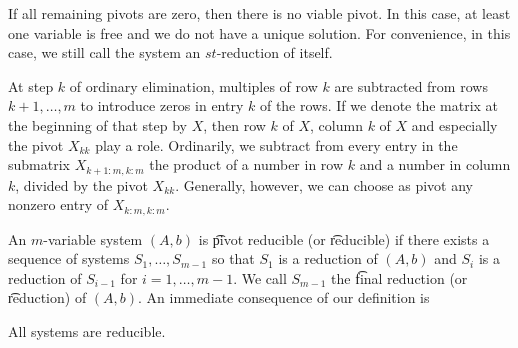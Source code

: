 If all remaining pivots are zero, then there is no viable pivot.
In this case, at least one variable is free and we do not have a unique solution.
For convenience, in this case, we still call the system an $st$-reduction of itself.


At step $k$ of ordinary elimination, multiples of row $k$ are subtracted from rows $k+1, \dots, m$ to introduce zeros in entry $k$ of the rows.
If we denote the matrix at the beginning of that step by $X$, then row $k$ of $X$, column $k$ of $X$ and especially the pivot $X_{kk}$ play a role.
Ordinarily, we subtract from every entry in the submatrix $X_{k+1:m,k:m}$ the product of a number in row $k$ and a number in column $k$, divided by the pivot $X_{kk}$.
Generally, however, we can choose as pivot any nonzero entry of $X_{k:m,k:m}$.

An $m$-variable system $(A, b)$ is \t{pivot reducible} (or \t{reducible}) if there exists a sequence of systems $S_1, \dots, S_{m-1}$ so that $S_1$ is a reduction of $(A, b)$ and $S_{i}$ is a reduction of $S_{i-1}$ for $i = 1, \dots, m-1$.
We call $S_{m-1}$ the \t{final reduction} (or \t{reduction}) of $(A, b)$.
An immediate consequence of our definition is

\begin{proposition}
	All systems are reducible.
\end{proposition}
